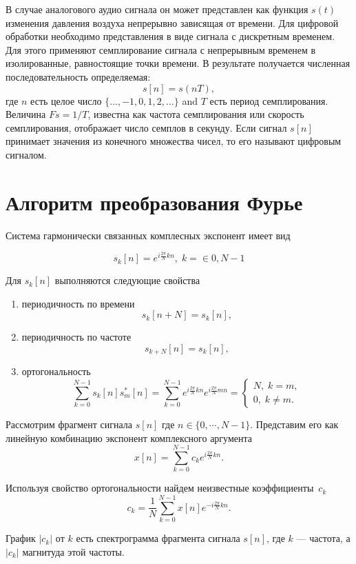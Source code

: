 \documentclass[oneside, final, 14pt]{extarticle}
\begin{document}
	В случае аналогового аудио сигнала он может представлен как функция $s(t)$ изменения давления воздуха непрерывно
	зависящая от времени. Для цифровой обработки необходимо представления в виде сигнала с дискретным временем. Для
	этого применяют семплирование сигнала с непрерывным временем в изолированные, равностоящие точки времени. В результате
	получается численная последовательность определяемая:
	\[
		s[n] = s(nT),
	\]
	где $n$ есть целое число $\{\dots, -1, 0, 1, 2, \dots\}$ and $T$ есть период семплирования. Величина $Fs=1/T$, известна
	как частота семплирования или скорость семплирования, отображает число семплов в секунду. Если сигнал $s[n]$ принимает
	значения из конечного множества чисел, то его называют цифровым сигналом.

\cleardoublepage
\section{Алгоритм преобразования Фурье}
	Система гармонически связанных комплесных экспонент имеет вид

	\[
		s_k[n]=e^{i\tfrac{2\pi}{N}kn}, \; k=\in{0,N-1}
	\]

	Для $s_k[n]$ выполняются следующие свойства

	\begin{enumerate}
	\item периодичность по времени \[
		s_k[n + N] = s_k[n],
	\]
	\item периодичность по частоте
	\[
		s_{k+N}[n] = s_k[n],
	\]
	\item ортогональность
	\[
		\sum_{k=0}^{N-1} s_k[n]s_m^*[n] = \sum_{k=0}^{N-1} e^{i\tfrac{2\pi}{N}kn} e^{i\tfrac{2\pi}{N}mn} =
		\left\{ \begin{aligned}
				N, \; k = m ,\\
				0, \; k \not= m.
			\end{aligned}
		\right.
	\]
	\end{enumerate}

	Рассмотрим фрагмент сигнала $s[n]$ где $n \in \{0,\cdots,N-1\}$. Представим его как линейную комбинацию экспонент комплексного
	аргумента
	\[
		x[n] = \sum_{k=0}^{N-1} c_k e^{i\tfrac{2\pi}{N}kn}.
	\]

	Используя свойство ортогональности найдем неизвестные коэффициенты~$c_k$
	\[
		c_k = \dfrac{1}{N} \sum_{k=0}^{N-1} x[n] e^{-i\tfrac{2\pi}{N}kn}.
	\]

	График $|c_k|$ от $k$ есть спектрограмма фрагмента сигнала $s[n]$, где $k$ --- частота,
	а $|c_k|$ магнитуда этой частоты.
\end{document}
